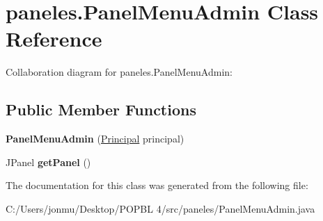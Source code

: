 \hypertarget{classpaneles_1_1_panel_menu_admin}{}\section{paneles.\+Panel\+Menu\+Admin Class Reference}
\label{classpaneles_1_1_panel_menu_admin}


Collaboration diagram for paneles.\+Panel\+Menu\+Admin\+:
\subsection*{Public Member Functions}
\begin{DoxyCompactItemize}
\item 
\mbox{\label{classpaneles_1_1_panel_menu_admin_ae686f35c694b90e334b64c385aa959ee}} 
{\bfseries Panel\+Menu\+Admin} (\mbox{\hyperlink{classvistas_1_1_principal}{Principal}} principal)
\item 
\mbox{\label{classpaneles_1_1_panel_menu_admin_a45a3165ede4cd4e1d926a7d07cedc8a1}} 
J\+Panel {\bfseries get\+Panel} ()
\end{DoxyCompactItemize}


The documentation for this class was generated from the following file\+:\begin{DoxyCompactItemize}
\item 
C\+:/\+Users/jonmu/\+Desktop/\+P\+O\+P\+B\+L 4/src/paneles/Panel\+Menu\+Admin.\+java\end{DoxyCompactItemize}
